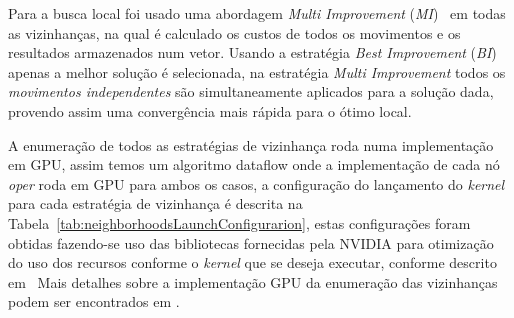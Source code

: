 Para a busca local foi usado uma abordagem \emph{Multi Improvement} (\emph{MI})~\cite{wamca2016} em todas as vizinhanças, na qual é calculado os custos de todos os movimentos e os resultados armazenados num vetor.
Usando a estratégia \emph{Best Improvement} (\emph{BI}) apenas a melhor solução é selecionada, na estratégia \emph{Multi Improvement} todos os \textit{movimentos independentes} são simultaneamente aplicados para a solução dada, provendo assim uma convergência mais rápida para o ótimo local.

A enumeração de todos as estratégias de vizinhança roda numa implementação em GPU, assim temos um algoritmo dataflow onde a implementação de cada nó \textit{oper} roda em GPU para ambos os casos, a configuração do lançamento do \emph{kernel} para cada estratégia de vizinhança é descrita na Tabela~\ref{tab:neighborhoodsLaunchConfigurarion}, estas configurações foram obtidas fazendo-se uso das bibliotecas fornecidas pela NVIDIA para otimização do uso dos recursos conforme o \emph{kernel} que se deseja executar, conforme descrito em~\cite{cudaProTipOccupancy}
Mais detalhes sobre a implementação GPU da enumeração das vizinhanças podem ser encontrados em \cite{wamca2016}.


